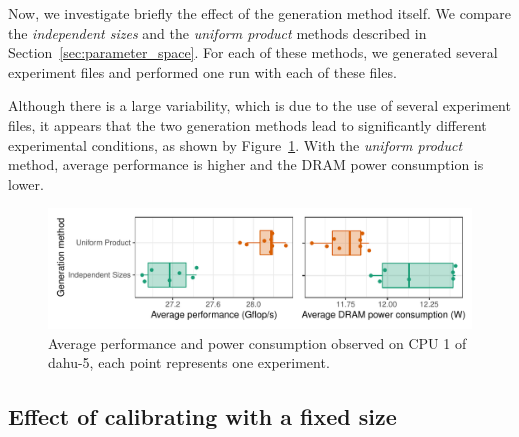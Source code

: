             Now, we investigate briefly the effect of the generation method itself. We compare the \emph{independent
            sizes} and the \emph{uniform product} methods described in Section~\ref{sec:parameter_space}. For each of
            these methods, we generated several experiment files and performed one run with each of these files.

            Although there is a large variability, which is due to the use of several experiment files, it appears that
            the two generation methods lead to significantly different experimental conditions, as shown by
            Figure~\ref{fig:randomizing_sizes:expfile:method}. With the \emph{uniform product} method, \dgemm average
            performance is higher and the DRAM power consumption is lower.

            \begin{figure}[htpb]
                \centering
                \includegraphics[width=\linewidth]{img/experiment/randomizing_sizes/method/average.pdf}
                \caption{Average \dgemm performance and power consumption observed on CPU 1 of dahu-5, each point
                represents one experiment.}%
                \label{fig:randomizing_sizes:expfile:method}
            \end{figure}


        \subsection{Effect of calibrating with a fixed size}%
        \label{sub:fixed_size}

